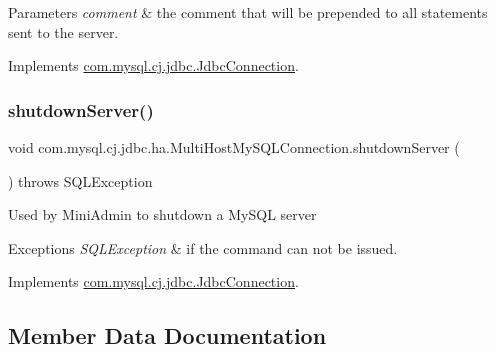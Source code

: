 \begin{DoxyParams}{Parameters}
{\em comment} & the comment that will be prepended to all statements sent to the server. \\
\hline
\end{DoxyParams}


Implements \mbox{\hyperlink{interfacecom_1_1mysql_1_1cj_1_1jdbc_1_1_jdbc_connection_adfbd59fbebd013673ed3eb97beb76179}{com.\+mysql.\+cj.\+jdbc.\+Jdbc\+Connection}}.

\mbox{\label{classcom_1_1mysql_1_1cj_1_1jdbc_1_1ha_1_1_multi_host_my_s_q_l_connection_a33803a0494610eb6148a4d8c1c9b046a}} 
\subsubsection{\texorpdfstring{shutdown\+Server()}{shutdownServer()}}
{\footnotesize\ttfamily void com.\+mysql.\+cj.\+jdbc.\+ha.\+Multi\+Host\+My\+S\+Q\+L\+Connection.\+shutdown\+Server (\begin{DoxyParamCaption}{ }\end{DoxyParamCaption}) throws S\+Q\+L\+Exception}

Used by Mini\+Admin to shutdown a My\+S\+QL server


\begin{DoxyExceptions}{Exceptions}
{\em S\+Q\+L\+Exception} & if the command can not be issued. \\
\hline
\end{DoxyExceptions}


Implements \mbox{\hyperlink{interfacecom_1_1mysql_1_1cj_1_1jdbc_1_1_jdbc_connection_ad9bedf228ed2ec194197ac2ceb960a94}{com.\+mysql.\+cj.\+jdbc.\+Jdbc\+Connection}}.



\subsection{Member Data Documentation}
\mbox{\label{classcom_1_1mysql_1_1cj_1_1jdbc_1_1ha_1_1_multi_host_my_s_q_l_connection_aa24e7362ca07c5968a5ecc7db8bbc841}} 
